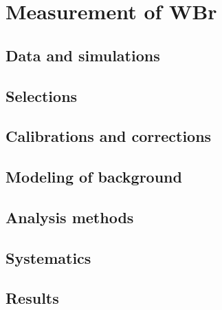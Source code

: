 \section{Measurement of WBr}

\subsection{Data and simulations}

\subsection{Selections}

\subsection{Calibrations and corrections}

\subsection{Modeling of background}

\subsection{Analysis methods}

\subsection{Systematics}

\subsection{Results}
